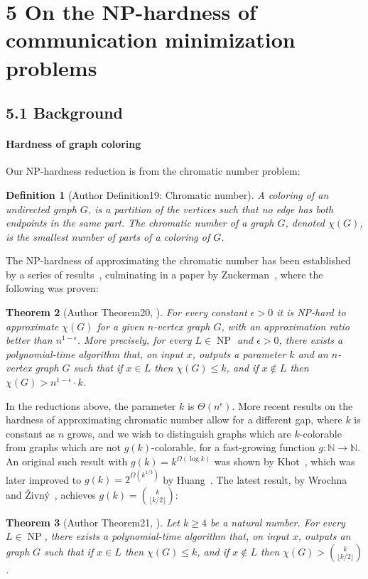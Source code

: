 \documentclass[10pt,a4paper]{article}
\newtheorem{nttheorem}{Theorem}
\newtheorem{ntdefinition}[nttheorem]{Definition}
\begin{document}
\section*{5 On the NP-hardness of communication minimization problems}
\subsection*{5.1 Background}
\paragraph{Hardness of graph coloring}
Our NP-hardness reduction is from the chromatic number problem:
\setcounter{nttheorem}{18}
\begin{ntdefinition}[Author Definition19: Chromatic number]
A coloring of an undirected graph $G$, is a partition of the vertices such that no edge has both endpoints in the same part. The chromatic number of a graph $G$, denoted $\chi(G)$, is the smallest number of parts of a coloring of $G$.
\end{ntdefinition}
The NP-hardness of approximating the chromatic number has been established by a series of results~\cite{ref57,ref31,ref24}, culminating in a paper by Zuckerman~\cite{ref82}, where the following was proven:
\begin{nttheorem}[Author Theorem20, {\cite{ref82}}]
For every constant $\epsilon>0$ it is NP-hard to approximate $\chi(G)$ for a given $n$-vertex graph $G$, with an approximation ratio better than $n^{1-\epsilon}$. More precisely, for every $L\in\operatorname{NP}$ and $\epsilon>0$, there exists a polynomial-time algorithm that, on input $x$, outputs a parameter $k$ and an $n$-vertex graph $G$ such that if $x\in L$ then $\chi(G)\leq k$, and if $x\notin L$ then $\chi(G)>n^{1-\epsilon}\cdot k$.
\end{nttheorem}
In the reductions above, the parameter $k$ is $\Theta(n^\epsilon)$. More recent results on the hardness of approximating chromatic number allow for a different gap, where $k$ is constant as $n$ grows, and we wish to distinguish graphs which are $k$-colorable from graphs which are not $g(k)$-colorable, for a fast-growing function $g:\mathbb N\to\mathbb N$. An original such result with $g(k)=k^{\Omega(\log k)}$ was shown by Khot~\cite{ref47}, which was later improved to $g(k)=2^{\Omega(k^{1/3})}$ by Huang~\cite{ref37}. The latest result, by Wrochna and \v Zivn\'y~\cite{ref79}, achieves $g(k)=\binom k{\lfloor k/2\rfloor}$:
\begin{nttheorem}[Author Theorem21, {\cite{ref79}}]
Let $k\geq4$ be a natural number. For every $L\in\operatorname{NP}$, there exists a polynomial-time algorithm that, on input $x$, outputs an graph $G$ such that if $x\in L$ then $\chi(G)\leq k$, and if $x\notin L$ then $\chi(G)>\binom k{\lfloor k/2\rfloor}$.
\end{nttheorem}
\end{document}
